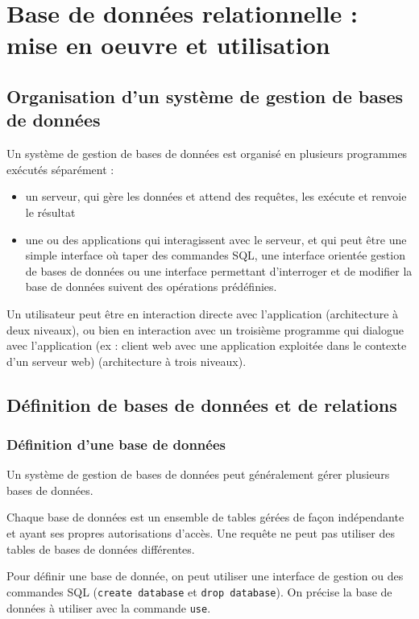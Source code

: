\chapter{Base de données relationnelle : mise en oeuvre et utilisation}

	\section{Organisation d'un système de gestion de bases de données}
	
	Un système de gestion de bases de données est organisé en plusieurs programmes exécutés séparément :
	
	\begin{itemize}
		\item un serveur, qui gère les données et attend des requêtes, les exécute et renvoie le résultat
		\item une ou des applications qui interagissent avec le serveur, et qui peut être une simple interface où taper des commandes SQL, une interface orientée gestion de bases de données ou une interface permettant d'interroger et de modifier la base de données suivent des opérations prédéfinies.
	\end{itemize}
	
	Un utilisateur peut être en interaction directe avec l'application (architecture à deux niveaux), ou bien en interaction avec un troisième programme qui dialogue avec l'application (ex : client web avec une application exploitée dans le contexte d'un serveur web) (architecture à trois niveaux).
	
	
	
	\section{Définition de bases de données et de relations}
	
		\subsection{Définition d'une base de données}
		Un système de gestion de bases de données peut généralement gérer plusieurs bases de données.
	
		Chaque base de données est un ensemble de tables gérées de façon indépendante et ayant ses propres autorisations d'accès. Une requête ne peut pas utiliser des tables de bases de données différentes.
	
		Pour définir une base de donnée, on peut utiliser une interface de gestion ou des commandes SQL (\texttt{create database} et \texttt{drop database}). On précise la base de données à utiliser avec la commande \texttt{use}.
		
